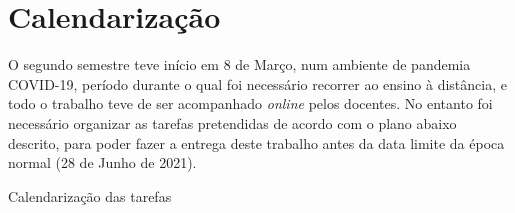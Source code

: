 \section{Calendarização}
O segundo semestre teve início em 8 de Março, num ambiente de pandemia COVID-19, período durante o qual foi necessário recorrer ao ensino à distância, e todo o trabalho teve de ser acompanhado \textit{online} pelos docentes. No entanto foi necessário organizar as tarefas pretendidas de acordo com o plano abaixo descrito, para poder fazer a entrega deste trabalho antes da data limite da época normal (28 de Junho de 2021).
\begin{table}[H]
	\caption{Calendarização das tarefas}
	\begin{ganttchart}{1}{20}
		\\
		\\
		 \\
		 \\
		 \\
		\\
		 \\
		 \\
		 \\%
		 \\%
		\\
		 \\
		 \\
		 \\
	\end{ganttchart}
	\label{gantt}
\end{table}
\newpage
